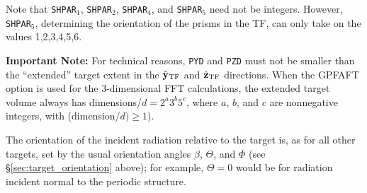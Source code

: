 	Note that {\tt SHPAR$_1$}, {\tt SHPAR$_2$}, {\tt SHPAR}$_4$, and 
        {\tt SHPAR}$_5$ need not be integers.  
        However, {\tt SHPAR}$_5$, determining the
	orientation of the prisms in the TF, can only take on the values
	1,2,3,4,5,6.

	{\bf Important Note:} 
	For technical reasons, {\tt PYD} and {\tt PZD} must not be smaller than
	the ``extended'' target extent in the $\hat{\bf y}_{\rm TF}$ 
	and $\hat{\bf z}_{\rm TF}$ directions.
	When the GPFAFT option is used 
	for the 3-dimensional FFT calculations, 
	the extended target volume always
	has dimensions/$d = 2^a3^b5^c$, where $a$, $b$, and $c$ are
	nonnegative 
	integers, with (dimension/$d)\geq 1$).  

	The orientation of the incident radiation relative to the target
	is, as for all other targets, set by the usual orientation
	angles $\beta$, $\Theta$, and $\Phi$ 
	(see \S\ref{sec:target_orientation} above); for example,
	$\Theta=0$ would be for radiation incident normal to the periodic
	structure.


